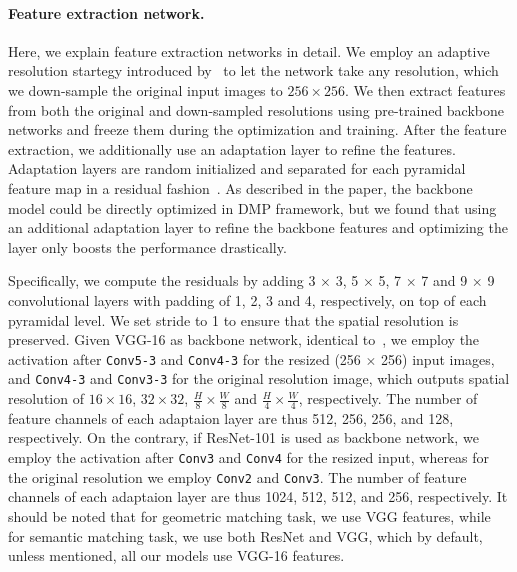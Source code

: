\documentclass[10pt,twocolumn,letterpaper]{article}
\begin{document}
\paragraph{Feature extraction network.} Here, we explain feature extraction networks in detail. We employ an adaptive resolution startegy introduced by~\cite{truong2020glu} to let the network take any resolution, which we down-sample the original input images to $256 \times 256$.  We then extract features from both the original and down-sampled resolutions using pre-trained backbone networks and freeze them during the optimization and training. After the feature extraction, we additionally use an adaptation layer to refine the features. Adaptation layers are random initialized and separated for each pyramidal feature map in a residual fashion~\cite{he2016deep}. 
As described in the paper, the backbone model could be directly optimized in DMP framework, but we found that using an additional
adaptation layer to refine the backbone features and optimizing the layer only boosts the performance drastically.

Specifically, we compute the residuals by adding 3 $\times$ 3, 5 $\times$ 5, 7 $\times$ 7 and 9 $\times$ 9 convolutional layers with padding of 1, 2, 3 and 4, respectively, on top of each pyramidal level. We set stride to 1 to ensure that the spatial resolution is preserved. Given VGG-16 as backbone network, identical to~\cite{truong2020glu}, we employ the activation after \verb|Conv5-3| and \verb|Conv4-3| for the resized (256 $\times$ 256) input images, and \verb|Conv4-3| and \verb|Conv3-3| for the original resolution image, which outputs spatial resolution of $16 \times 16$, $32 \times 32$, $\frac{H}{8} \times \frac{W}{8}$ and $\frac{H}{4} \times \frac{W}{4}$, respectively. The number of feature channels of each adaptaion layer are thus 512, 256, 256, and 128, respectively. On the contrary, if ResNet-101 is used as backbone network, we employ the activation after \verb|Conv3| and \verb|Conv4| for the resized input, whereas for the original resolution we employ \verb|Conv2| and \verb|Conv3|. The number of feature channels of each adaptaion layer are thus 1024, 512, 512, and 256, respectively. 
It should be noted that for geometric matching task, we use VGG features, while for semantic matching task, we use both ResNet and VGG, which by default, unless mentioned, all our models use VGG-16 features. 
\vspace{-10pt}
	
\end{document}
